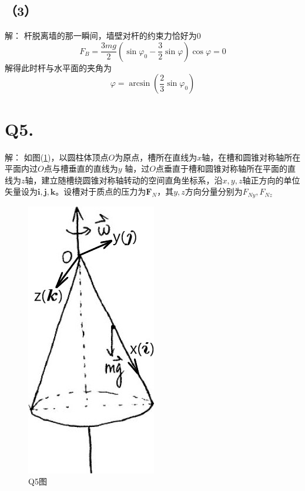 \documentclass[10pt,a4paper]{article}
\theoremstyle{remark}
\begin{document}
\subsection*{（3）}解：
杆脱离墙的那一瞬间，墙壁对杆的约束力恰好为$0$
\[
F_B = \frac{3mg}{2}(\sin\varphi_0 - \frac{3}{2}\sin\varphi)\cos\varphi = 0
\]
解得此时杆与水平面的夹角为
\[
\varphi = \arcsin(\frac{2}{3}\sin\varphi_0)
\]
\section*{Q5.}解：
如图(\ref{FigureofHomework_2Problem_5})，以圆柱体顶点$O$为原点，槽所在直线为$x$轴，在槽和圆锥对称轴所在平面内过$O$点与槽垂直的直线为$y$ 轴，过$O$点垂直于槽和圆锥对称轴所在平面的直线为$z$轴，建立随槽绕圆锥对称轴转动的空间直角坐标系，沿$x,y,z$轴正方向的单位矢量设为$\bm{i},\bm{j},\bm{k}$。设槽对于质点的压力为$\bm{F}_N$，其$y,z$方向分量分别为$F_{Ny},F_{Nz}$
\begin{figure}[h]
\centering
\includegraphics[scale=.6]{FigureofHomework_2Problem_5.jpg}
\caption{Q5图}\label{FigureofHomework_2Problem_5}
\end{figure}
\end{document}
